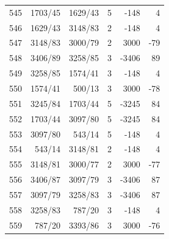 \documentclass[11pt,a4paper]{article}
\begin{document}
\begin{minipage}[t]{.49\linewidth}
\begin{tabular*}{\linewidth}{@{}r@{\extracolsep{\fill}}rrrrr@{}}
545 & 1703/45 & 1629/43 & 5 & -148 & 4\\
546 & 1629/43 & 3148/83 & 2 & -148 & 4\\
547 & 3148/83 & 3000/79 & 2 & 3000 & -79\\
548 & 3406/89 & 3258/85 & 3 & -3406 & 89\\
549 & 3258/85 & 1574/41 & 3 & -148 & 4\\
550 & 1574/41 & 500/13 & 3 & 3000 & -78\\
551 & 3245/84 & 1703/44 & 5 & -3245 & 84\\
552 & 1703/44 & 3097/80 & 5 & -3245 & 84\\
553 & 3097/80 & 543/14 & 5 & -148 & 4\\
554 & 543/14 & 3148/81 & 2 & -148 & 4\\
555 & 3148/81 & 3000/77 & 2 & 3000 & -77\\
556 & 3406/87 & 3097/79 & 3 & -3406 & 87\\
557 & 3097/79 & 3258/83 & 3 & -3406 & 87\\
558 & 3258/83 & 787/20 & 3 & -148 & 4\\
559 & 787/20 & 3393/86 & 3 & 3000 & -76\\
\bottomrule\end{tabular*}\end{minipage}\hfill
\end{document}
